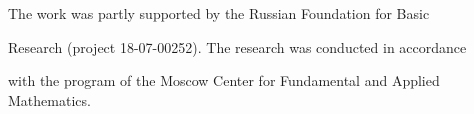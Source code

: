 

















\Ack


\noindent


The work was partly supported by the Russian Foundation for Basic 


Research (project 18-07-00252). The research was conducted in accordance 


with the program of the Moscow Center for Fundamental and Applied Mathematics. 


 










\renewcommand{\bibname}{\protect\rmfamily References}








